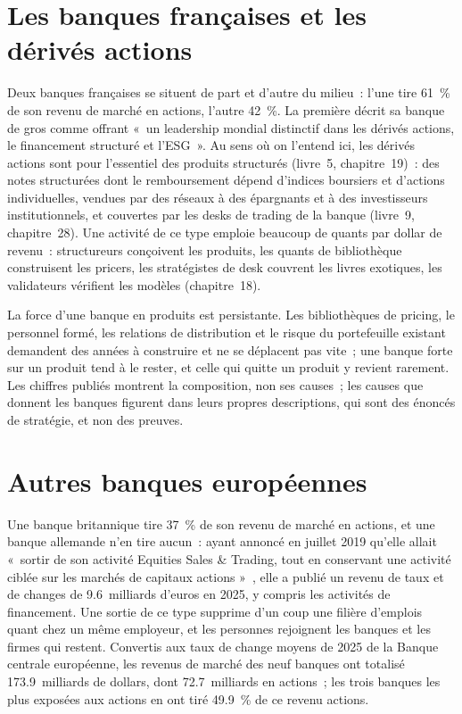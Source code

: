 \section{Les banques françaises et les dérivés actions}

Deux banques françaises se situent de part et d'autre du milieu~: l'une tire 61~\% de son revenu de marché en actions, l'autre 42~\%.
La première décrit sa banque de gros comme offrant «~un leadership mondial distinctif dans les dérivés actions, le financement structuré
et l'ESG~». Au sens où on l'entend ici, les dérivés actions sont pour l'essentiel des produits structurés (livre~5, chapitre~19)~: des notes structurées
dont le remboursement dépend d'indices boursiers et d'actions individuelles, vendues par des réseaux à des épargnants et à des investisseurs institutionnels, et couvertes par les
desks de trading de la banque (livre~9, chapitre~28). Une activité de ce type emploie beaucoup de quants par dollar de revenu~:
structureurs conçoivent les produits, les quants de bibliothèque construisent les pricers, les stratégistes de desk couvrent les livres exotiques, les validateurs
vérifient les modèles (chapitre~18).

\begin{remark}\label{rem:in:bank-markets-divisions:why}
La force d'une banque en produits est persistante. Les bibliothèques de pricing, le personnel formé, les relations de distribution et le risque du
portefeuille existant demandent des années à construire et ne se déplacent pas vite~; une banque forte sur un produit tend à le rester, et celle
qui quitte un produit y revient rarement. Les chiffres publiés montrent la composition, non ses causes~; les causes que donnent les banques figurent
dans leurs propres descriptions, qui sont des énoncés de stratégie, et non des preuves.
\end{remark}

\section{Autres banques européennes}

Une banque britannique tire 37~\% de son revenu de marché en actions, et une banque allemande n'en tire aucun~: ayant annoncé en juillet 2019
qu'elle allait «~sortir de son activité Equities Sales \& Trading, tout en conservant une activité ciblée sur les marchés de capitaux actions
»~, elle a publié un revenu de taux et de changes de 9.6~milliards d'euros en 2025, y compris les
activités de financement. Une sortie de ce type supprime d'un coup une filière d'emplois quant chez un même employeur, et les personnes rejoignent
les banques et les firmes qui restent. Convertis aux taux de change moyens de 2025 de la Banque centrale européenne, les revenus de marché des neuf banques
ont totalisé 173.9~milliards de dollars, dont 72.7~milliards en actions~; les trois banques les plus exposées aux actions en ont tiré 49.9~\%
de ce revenu actions.

